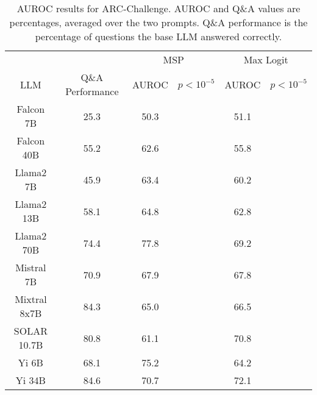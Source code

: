 \begin{table*}
\centering
\begin{tabular}{c|c|c|c|c|c}
& & \multicolumn{2}{c|}{MSP} & \multicolumn{2}{c}{Max Logit} \\ 
LLM & Q\&A Performance & AUROC & $p < 10^{-5}$ & AUROC & $p < 10^{-5}$\\ \hline
Falcon 7B & 25.3 & 50.3 &  & 51.1 & \\
Falcon 40B & 55.2 & 62.6 &  & 55.8 & \\
Llama2 7B & 45.9 & 63.4 &  & 60.2 & \\
Llama2 13B & 58.1 & 64.8 &  & 62.8 & \\
Llama2 70B & 74.4 & 77.8 &  & 69.2 & \\
Mistral 7B & 70.9 & 67.9 &  & 67.8 & \\
Mixtral 8x7B & 84.3 & 65.0 &  & 66.5 & \\
SOLAR 10.7B & 80.8 & 61.1 &  & 70.8 & \\
Yi 6B & 68.1 & 75.2 &  & 64.2 & \\
Yi 34B & 84.6 & 70.7 &  & 72.1 & \\
\hline
\end{tabular}
\caption{AUROC results for ARC-Challenge. AUROC and Q\&A values are percentages, averaged over the two prompts. Q\&A performance is the percentage of questions the base LLM answered correctly.}
\label{tab:arc_auroc}
\end{table*}
